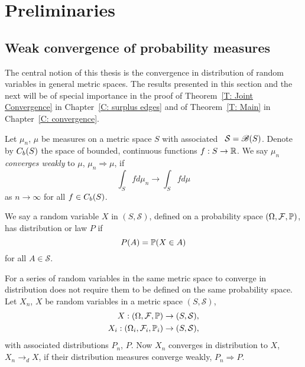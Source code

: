 
\chapter{Preliminaries} \label{C: preliminaries}

\section{Weak convergence of probability measures} \label{S: weak convergence}

The central notion of this thesis is the convergence in distribution of random variables in general metric spaces.
The results presented in this section and the next will be of special importance in the proof of Theorem~\ref{T: Joint Convergence}
in Chapter~\ref{C: surplus edges} and of Theorem~\ref{T: Main} in Chapter~\ref{C: convergence}.

\begin{definition} \label{D: weak convergence}
	Let $\mu_n$, $\mu$ be measures on a metric space $S$ with associated \Bosi~$\mathcal{S} = \mathscr{B}(S)$.
	Denote by $C_b(S)$ the space of bounded, continuous functions $f: S \rightarrow \mathbb{R}$.
	We say $\mu_n$ \emph{converges weakly} to $\mu$, $\mu_n \Rightarrow \mu$, if
	\begin{equation}
		\int_S fd\mu_n \rightarrow \int_S fd\mu
	\end{equation}
	as $n \rightarrow \infty$ for all $f \in C_b(S)$.
\end{definition}

We say a random variable $X$ in $(S, \mathcal{S})$, 
defined on a probability space $(\Omega, \mathcal{F}, \mathbb{P})$,
has distribution or law $P$ if
\begin{equation}
	P(A) = \mathbb{P}(X \in A)
\end{equation}
for all $A \in \mathcal{S}$.

For a series of random variables in the same metric space to converge in distribution 
does not require them to be defined on the same probability space.
Let $X_n$, $X$ be random variables in a metric space $(S, \mathcal{S})$,
\begin{equation}
\begin{aligned}
	X: (\Omega, \mathcal{F}, \mathbb{P}) &\rightarrow (S, \mathcal{S}), \\
	X_i: (\Omega_i, \mathcal{F}_i, \mathbb{P}_i) &\rightarrow (S, \mathcal{S}),
\end{aligned}
\end{equation}
with associated distributions $P_n$, $P$.
Now $X_n$ converges in distribution to $X$, $X_n \rightarrow_d X$,
if their distribution measures converge weakly, $P_n \Rightarrow P$.


